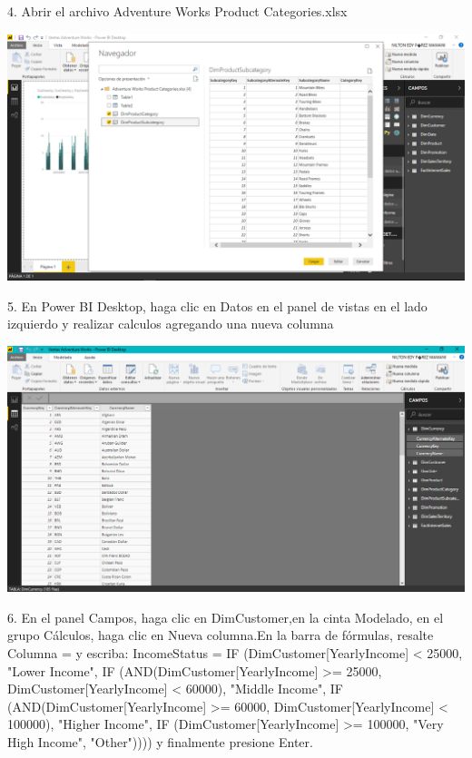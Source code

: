 \begin{itemize}
4. Abrir el archivo Adventure Works Product Categories.xlsx
\end{itemize} 

\begin{center}
\includegraphics[width=15cm]{./Imagenes/img4} 
\end{center}

\begin{itemize}
5. En Power BI Desktop, haga clic en Datos en el panel de vistas en el lado izquierdo y realizar calculos agregando una nueva columna

\end{itemize}

\begin{center}
\includegraphics[width=15cm]{./Imagenes/img5} 
\end{center}

\begin{itemize}
6. En el panel Campos, haga clic en DimCustomer,en la cinta Modelado, en el grupo Cálculos, haga clic en Nueva columna.En la barra de fórmulas, resalte Columna = y escriba:
IncomeStatus = IF (DimCustomer[YearlyIncome] < 25000, "Lower Income",
IF (AND(DimCustomer[YearlyIncome] >= 25000, DimCustomer[YearlyIncome] < 60000),
"Middle Income",
IF (AND(DimCustomer[YearlyIncome] >= 60000, DimCustomer[YearlyIncome] < 100000),
"Higher Income",
IF (DimCustomer[YearlyIncome] >= 100000, "Very High Income", "Other")))) y finalmente presione Enter.
\end{itemize}

